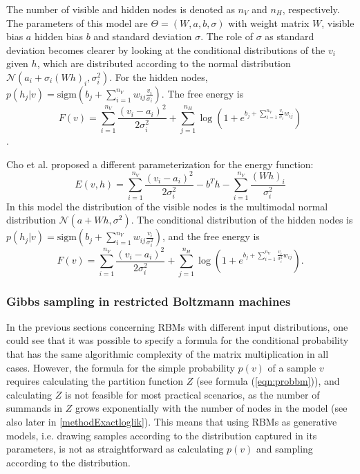\documentclass[12pt]{article}
\newcommand{\sigm}{\mathrm{sigm}}
\begin{document}
The number of visible and hidden nodes is denoted as $n_V$ and $n_H$, respectively. The parameters of this model are $\Theta = (W, a, b, \sigma)$ with weight matrix $W$, visible bias $a$ hidden bias $b$ and standard deviation $\sigma$. The role of $\sigma$ as standard deviation becomes clearer by looking at the conditional distributions of the $v_i$ given $h$, which are distributed according to the normal distribution $\mathcal{N}(a_i + \sigma_i(Wh)_i, \sigma_i^2)$. For the hidden nodes, $p(h_j | v) = \sigm \left (b_j + \sum_{i=1}^{n_V} w_{ij} \frac{v_i}{\sigma_i} \right )$.
The free energy is
\begin{equation}
   F(v) = \sum_{i=1}^{n_V}\frac{(v_i - a_i)^2}{2\sigma_i^2} + \sum_{j=1}^{n_H} \log \left (1 + e^{b_j + \sum_{i=1}^{n_V} \frac{v_i}{\sigma_i} w_{ij}} \right)
\label{eqn:freenergy_gbrbm}
\end{equation}
\citep{krizhevsky2009tinyimages}.

Cho et al. \citep{cho2011improved} proposed a different parameterization for the energy function:
\begin{equation}
   E(v,h) = \sum_{i=1}^{n_V}\frac{(v_i - a_i)^2}{2\sigma_i^2} - b^T h - \sum_{i=1}^{n_V} \frac{(Wh)_i}{\sigma_i^2}
   \label{eqn:energyformulagbrbm2}
\end{equation}
In this model the distribution of the visible nodes is the multimodal normal distribution $\mathcal{N}(a + Wh, \sigma^2)$.
The conditional distribution of the hidden nodes is $p(h_j | v) = \sigm \left (b_j + \sum_{i=1}^{n_V} w_{ij} \frac{v_i}{\sigma_i^2} \right )$, and the free energy is
\begin{equation*}
   F(v) = \sum_{i=1}^{n_V}\frac{(v_i - a_i)^2}{2\sigma_i^2} + \sum_{j=1}^{n_H} \log \left (1 + e^{b_j + \sum_{i=1}^{n_V} \frac{v_i}{\sigma_i^2} w_{ij}} \right).
\end{equation*}



\subsubsection{Gibbs sampling in restricted Boltzmann machines}\label{gibbssamplingrbm}
In the previous sections concerning RBMs with different input distributions, one could see that it was possible to specify a formula for the conditional probability that has the same  algorithmic complexity of the matrix multiplication in all cases.
However, the formula for the simple probability $p(v)$ of a sample $v$ requires calculating the partition function $Z$ (see formula (\ref{eqn:probbm})), and calculating $Z$ is not feasible for most practical scenarios, as the number of summands in $Z$ grows exponentially with the number of nodes in the model (see also later in \ref{methodExactloglik}).
This means that using RBMs as generative models, i.e. drawing samples according to the distribution captured in its parameters, is not as straightforward as calculating $p(v)$ and sampling according to the distribution.
\end{document}
